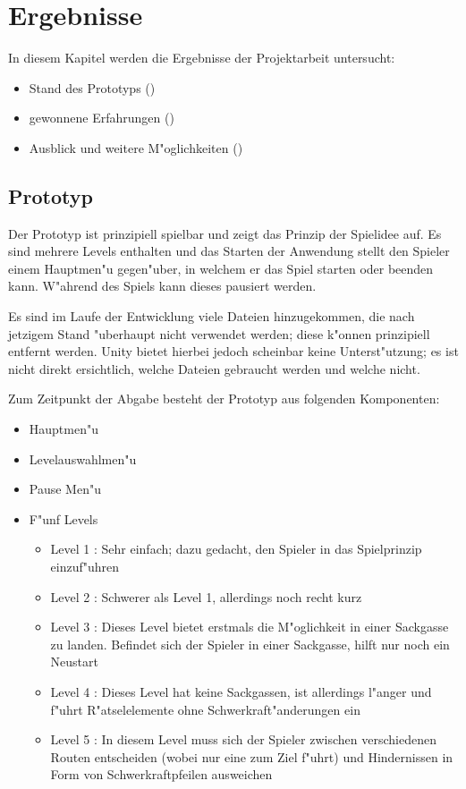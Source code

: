 \section{Ergebnisse}
\label{sec:results}
%
In diesem Kapitel werden die Ergebnisse der Projektarbeit untersucht:
\begin{itemize}
	\item
		Stand des Prototyps ()
	\item
		gewonnene Erfahrungen ()
	\item
		Ausblick und weitere M"oglichkeiten ()
\end{itemize}
%
\subsection{Prototyp}
\label{sec:results/prototype}
%
Der Prototyp ist prinzipiell spielbar und zeigt das Prinzip der
Spielidee auf. Es sind mehrere Levels enthalten und das Starten
der Anwendung stellt den Spieler einem Hauptmen"u gegen"uber, in
welchem er das Spiel starten oder beenden kann. W"ahrend des Spiels
kann dieses pausiert werden.

Es sind im Laufe der Entwicklung viele Dateien hinzugekommen, die
nach jetzigem Stand "uberhaupt nicht verwendet werden; diese k"onnen
prinzipiell entfernt werden. Unity bietet hierbei jedoch scheinbar
keine Unterst"utzung; es ist nicht direkt ersichtlich, welche
Dateien gebraucht werden und welche nicht.

Zum Zeitpunkt der Abgabe besteht der Prototyp aus folgenden Komponenten:
\begin{itemize}
	\item Hauptmen"u
	\item Levelauswahlmen"u
	\item Pause Men"u
	\item F"unf Levels
	\begin{itemize}
		\item Level 1 : Sehr einfach; dazu gedacht, den Spieler in das Spielprinzip einzuf"uhren
		\item Level 2 : Schwerer als Level 1, allerdings noch recht kurz
		\item Level 3 : Dieses Level bietet erstmals die M"oglichkeit in einer Sackgasse zu landen.
			Befindet sich der Spieler in einer Sackgasse, hilft nur noch ein Neustart
		\item Level 4 : Dieses Level hat keine Sackgassen, ist allerdings l"anger und f"uhrt
			R"atselelemente ohne Schwerkraft"anderungen ein
		\item Level 5 : In diesem Level muss sich der Spieler zwischen verschiedenen Routen
			entscheiden (wobei nur eine zum Ziel f"uhrt) und Hindernissen in Form von
			Schwerkraftpfeilen ausweichen
	\end{itemize}
\end{itemize}

